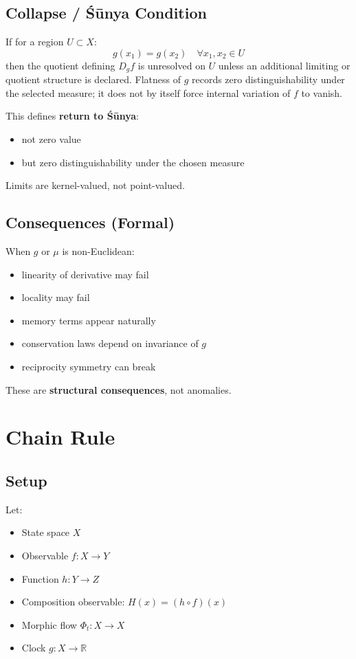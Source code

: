 \documentclass[12pt, oneside]{article}
\begin{document}
\subsection{Collapse / Śūnya Condition}

If for a region $U \subset X$:
\begin{equation}
g(x_1) = g(x_2) \quad \forall x_1, x_2 \in U
\end{equation}
then the quotient defining $D_gf$ is unresolved on $U$ unless an additional limiting or quotient structure is declared. Flatness of $g$ records zero distinguishability under the selected measure; it does not by itself force internal variation of $f$ to vanish.

This defines \textbf{return to Śūnya}:
\begin{itemize}
    \item not zero value
    \item but zero distinguishability under the chosen measure
\end{itemize}
Limits are kernel-valued, not point-valued.

\subsection{Consequences (Formal)}

When $g$ or $\mu$ is non-Euclidean:
\begin{itemize}
    \item linearity of derivative may fail
    \item locality may fail
    \item memory terms appear naturally
    \item conservation laws depend on invariance of $g$
    \item reciprocity symmetry can break
\end{itemize}
These are \textbf{structural consequences}, not anomalies.

\section{Chain Rule}

\subsection{Setup}

Let:
\begin{itemize}
    \item State space $X$
    \item Observable $f: X \rightarrow Y$
    \item Function $h: Y \rightarrow Z$
    \item Composition observable: $H(x) = (h \circ f)(x)$
    \item Morphic flow $\Phi_t: X \rightarrow X$
    \item Clock $g: X \rightarrow \mathbb{R}$
\end{itemize}
\end{document}
